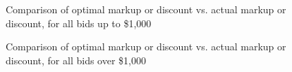 \documentclass[conference]{IEEEtran}
\begin{document}
\begin{center}
    \begin{figure}[htb]
        \caption{Comparison of optimal markup or discount vs. actual markup or discount, for all bids up to \$1,000}
        \vspace{0.4cm}
        \caption{Comparison of optimal markup or discount vs. actual markup or discount, for all bids over \$1,000}
    \end{figure}
\end{center}
\end{document}
